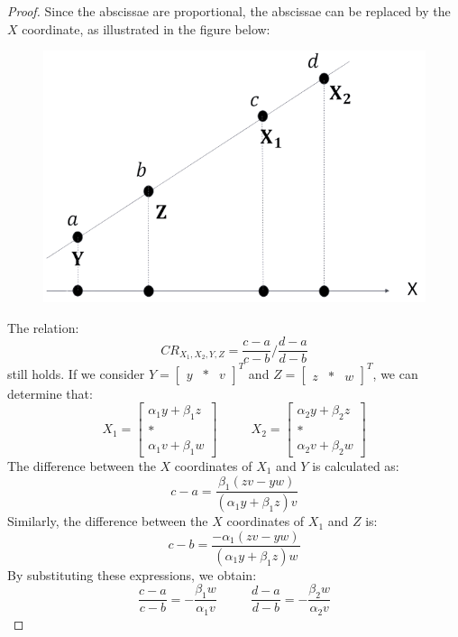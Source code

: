 \documentclass[12pt, a4paper]{report}
\begin{document}
    \begin{proof}
        Since the abscissae are proportional, the abscissae can be replaced by the $X$ coordinate, as illustrated in the figure below:
        \begin{figure}[H]
            \centering
            \includegraphics[width=0.3\linewidth]{images/abscissae.png}
        \end{figure}
        The relation:
        \[CR_{X_1,X_2,Y,Z}=\dfrac{c-a}{c-b}/\dfrac{d-a}{d-b}\]
        still holds. 
        If we consider $Y={\begin{bmatrix} y & * & v \end{bmatrix}}^T$ and $Z={\begin{bmatrix} z & * & w \end{bmatrix}}^T$, we can determine that:
        \[ X_1=\begin{bmatrix} \alpha_1y+\beta_1z \\ * \\ \alpha_1v+\beta_1w \end{bmatrix} \:\:\:\:\:\:\:\:\:\:\:\: X_2=\begin{bmatrix} \alpha_2y+\beta_2z \\ * \\ \alpha_2v+\beta_2w \end{bmatrix}\]
        The difference between the $X$ coordinates of $X_1$ and $Y$ is calculated as:
        \[c-a=\dfrac{\beta_1(zv-yw)}{(\alpha_1y+\beta_1z)v}\]
        Similarly, the difference between the $X$ coordinates of $X_1$ and $Z$ is:
        \[c-b=\dfrac{-\alpha_1(zv-yw)}{(\alpha_1y+\beta_1z)w}\]
        By substituting these expressions, we obtain:
        \[ \dfrac{c-a}{c-b}=-\dfrac{\beta_1w}{\alpha_1v} \:\:\:\:\:\:\:\:\:\:\:\: \dfrac{d-a}{d-b}=-\dfrac{\beta_2w}{\alpha_2v}\]
    \end{proof}
\end{document}
